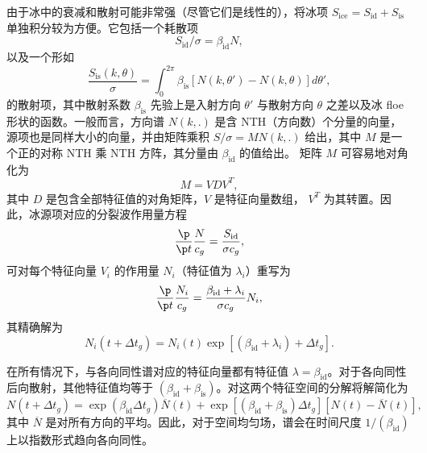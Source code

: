由于冰中的衰减和散射可能非常强（尽管它们是线性的），将冰项
$S_{\mathrm{ice}}=S_{\mathrm{id}}+S_{\mathrm{is}}$ 单独积分较为方便。它包括一个耗散项
\begin{equation}
S_{\mathrm{id}}/\sigma  = \beta_{\mathrm{id}} N ,
\end{equation}
以及一个形如
\begin{equation}
 \frac{S_{\mathrm{is}}(k,\theta)}{\sigma} =  \int_0^{2\pi}\beta_{\mathrm{is}} [N(k,\theta')-N(k,\theta)] d\theta'  ,
 \end{equation}
的散射项，其中散射系数 $\beta_{\mathrm{is}}$ 先验上是入射方向 $\theta'$ 与散射方向 $\theta$ 之差以及冰 floe 形状的函数。一般而言，方向谱 $N(k,.)$ 是含 {\F NTH}（方向数）个分量的向量，源项也是同样大小的向量，并由矩阵乘积 $S/\sigma = M N(k,.)$ 给出，其中
$M$ 是一个正的对称 {\F NTH} 乘 {\F NTH} 方阵，其分量由 $\beta_{\mathrm{id}}$ 的值给出。
矩阵 $M$ 可容易地对角化为
\begin{equation}
 M  =  V D V^T  ,
 \end{equation}
其中 $D$ 是包含全部特征值的对角矩阵，$V$ 是特征向量数组，
$V^T$ 为其转置。因此，冰源项对应的分裂波作用量方程
 \begin{equation}
\frac{\p}{\p t} \frac{N}{c_g}   = \frac{S_{\mathrm{id}}}{\sigma c_g} ,
 \end{equation}
可对每个特征向量 $V_i$ 的作用量 $N_i$（特征值为 $\lambda_i$）重写为
  \begin{equation}
\frac{\p}{\p t} \frac{N_i}{c_g}   = \frac{\beta_{\mathrm{id}} + \lambda_i}{\sigma c_g} N_i ,
 \end{equation}
其精确解为
   \begin{equation}
 {N_i}(t+\Delta t_g)   = N_i(t) \exp \left[ (\beta_{\mathrm{id}} + \lambda_i) +\Delta t_g\right].
 \end{equation}
 
在所有情况下，与各向同性谱对应的特征向量都有特征值 $\lambda=\beta_{\mathrm{id}}$。对于各向同性后向散射，其他特征值均等于 $(\beta_{\mathrm{id}} + \beta_{\mathrm{is}})$。对这两个特征空间的分解将解简化为
\begin{equation}
 N(t+\Delta t_g) = \exp(\beta_{\mathrm{id}} \Delta t_g) \overline{N}(t)  + \exp \left[\left(\beta_{\mathrm{id}} + \beta_{\mathrm{is}}\right) \Delta t_g\right] \left[N(t)-\overline{N}(t)\right]
, \label{eq:exact_st_ice} \end{equation}
其中 $\overline{N}$ 是对所有方向的平均。因此，对于空间均匀场，谱会在时间尺度 $1/(\beta_{\mathrm{id}})$ 上以指数形式趋向各向同性。
